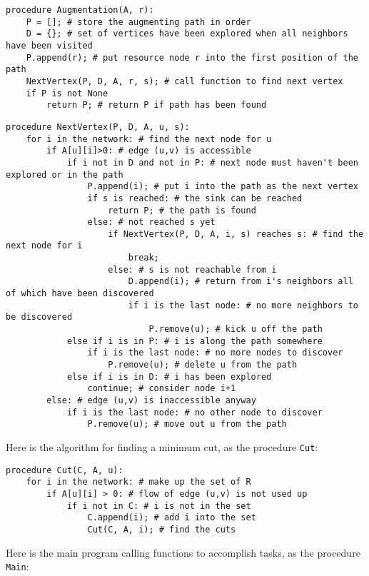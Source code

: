 \documentclass[11pt]{article}
\begin{document}
{\small
\begin{verbatim}procedure Augmentation(A, r):
    P = []; # store the augmenting path in order
    D = {}; # set of vertices have been explored when all neighbors have been visited
    P.append(r); # put resource node r into the first position of the path
    NextVertex(P, D, A, r, s); # call function to find next vertex
    if P is not None
        return P; # return P if path has been found\end{verbatim}
  }
{\small
\begin{verbatim}procedure NextVertex(P, D, A, u, s):
    for i in the network: # find the next node for u
        if A[u][i]>0: # edge (u,v) is accessible
            if i not in D and not in P: # next node must haven't been explored or in the path
                P.append(i); # put i into the path as the next vertex
                if s is reached: # the sink can be reached
                    return P; # the path is found
                else: # not reached s yet
                    if NextVertex(P, D, A, i, s) reaches s: # find the next node for i
                        break;
                    else: # s is not reachable from i
                        D.append(i); # return from i's neighbors all of which have been discovered
                        if i is the last node: # no more neighbors to be discovered
                            P.remove(u); # kick u off the path
            else if i is in P: # i is along the path somewhere
                if i is the last node: # no more nodes to discover
                    P.remove(u); # delete u from the path
            else if i is in D: # i has been explored
                continue; # consider node i+1
        else: # edge (u,v) is inaccessible anyway
            if i is the last node: # no other node to discover
                P.remove(u); # move out u from the path
\end{verbatim}
  }
Here is the algorithm for finding a minimum cut, as the procedure \texttt{Cut}:

{\small
\begin{verbatim}procedure Cut(C, A, u):
    for i in the network: # make up the set of R
        if A[u][i] > 0: # flow of edge (u,v) is not used up
            if i not in C: # i is not in the set
                C.append(i); # add i into the set
                Cut(C, A, i); # find the cuts
\end{verbatim}
  }
Here is the main program calling functions to accomplish tasks, as the procedure \texttt{Main}:
\end{document}
